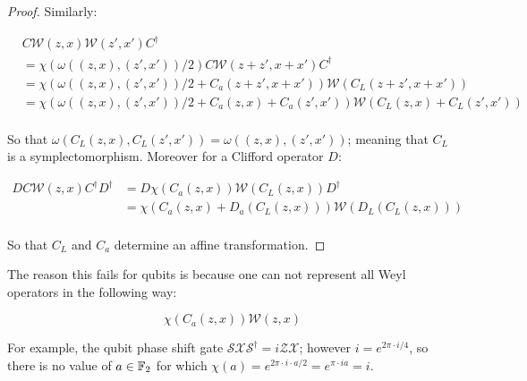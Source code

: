 \begin{proof}
Similarly:

\begin{align*}
&C\mathcal{W}(z,x)\mathcal{W}(z',x')C^\dag\\
&= \chi(\omega((z,x),(z',x'))/2) C \mathcal{W}(z+z',x+x') C^\dag\\
&= \chi(\omega((z,x),(z',x'))/2+C_a(z+z',x+x')) \mathcal{W}(C_{L}(z+z',x+x'))\\
&= \chi(\omega((z,x),(z',x'))/2+C_a(z,x)+ C_a(z',x')) \mathcal{W}(C_L(z,x)+C_L(z',x'))\\
\end{align*}


So that $\omega(C_L(z,x),C_L(z',x')) = \omega((z,x),(z',x'))$; meaning that $C_L$ is a symplectomorphism. Moreover for a Clifford operator $D$:

\begin{align*}
DC {\mathcal W}(z,x) C^\dag D^\dag
&=D\chi(C_a(z,x)){\mathcal W}(C_L(z,x))D^\dag\\
&=\chi(C_a(z,x)+D_a(C_L(z,x))){\mathcal W}(D_L(C_L(z,x)))\\
\end{align*}

So that $C_L$ and $C_a$ determine an affine transformation.

\end{proof}


The reason this fails for qubits is because one can not represent all Weyl operators in the following way:

$$
\chi(C_a(z,x)){\mathcal W}(z,x)
$$

 For example, the qubit phase shift gate $\mathcal{S}\mathcal{X} \mathcal{S}^{\dag} = i \mathcal{Z}\mathcal{X}$; however $i=e^{2\pi \cdot i/4}$, so there is no value of $a\in \mathbb{F}_2$ for which $\chi(a)=e^{2\pi\cdot i\cdot a/2} =e^{\pi\cdot i a} = i$.


